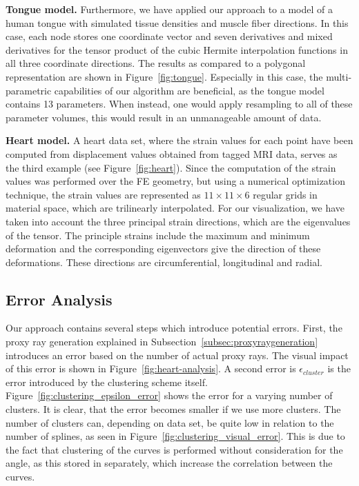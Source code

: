 \documentclass[review,journal]{vgtc}         %
\begin{document}
\noindent \textbf{Tongue model.} Furthermore, we have applied our approach to a model of a human tongue with simulated tissue densities and muscle fiber directions. In this case, each node stores one coordinate vector and seven derivatives and mixed derivatives for the tensor product of the cubic Hermite interpolation functions in all three coordinate directions. The results as compared to a polygonal representation are shown in Figure~\ref{fig:tongue}. Especially in this case, the multi-parametric capabilities of our algorithm are beneficial, as the tongue model contains 13 parameters. When instead, one would apply resampling to all of these parameter volumes, this would result in an unmanageable amount of data.

\noindent \textbf{Heart model.} A heart data set, where the strain values for each point have been computed from displacement values obtained from tagged MRI data, serves as the third example (see Figure~\ref{fig:heart}). Since the computation of the strain values was performed over the FE geometry, but using a numerical optimization technique, the strain values are represented as $11 \times 11 \times 6$ regular grids in material space, which are trilinearly interpolated. For our visualization, we have taken into account the three principal strain directions, which are the eigenvalues of the tensor. The principle strains include the maximum and minimum deformation and the corresponding eigenvectors give the direction of these deformations. These directions are circumferential, longitudinal and radial.

\subsection{Error Analysis}\label{subsec:error}
Our approach contains several steps which introduce potential errors. First, the proxy ray generation explained in Subsection~\ref{subsec:proxyraygeneration} introduces an error based on the number of actual proxy rays. The visual impact of this error is shown in Figure~\ref{fig:heart-analysis}. A second error is $\epsilon_{cluster}$ is the error introduced by the clustering scheme itself. Figure~\ref{fig:clustering_epsilon_error} shows the error for a varying number of clusters. It is clear, that the error becomes smaller if we use more clusters. The number of clusters can, depending on data set, be quite low in relation to the number of splines, as seen in Figure~\ref{fig:clustering_visual_error}. This is due to the fact that clustering of the curves is performed without consideration for the angle, as this stored in separately, which increase the correlation between the curves.
\end{document}
